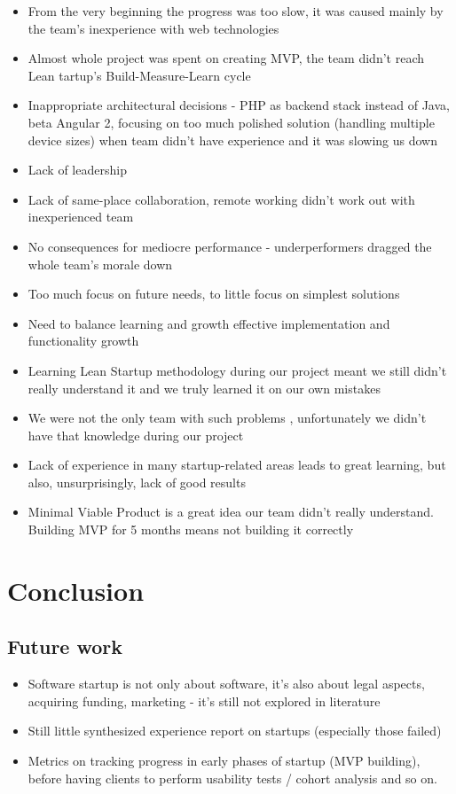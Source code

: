 \documentclass{article}
\begin{document}
\begin{itemize}
  \item From the very beginning the progress was too slow, it was caused mainly by the team's inexperience with web technologies 
  \item Almost whole project was spent on creating MVP, the team didn't reach Lean tartup's Build-Measure-Learn cycle
  \item Inappropriate architectural decisions - PHP as backend stack instead of Java, beta Angular 2, focusing on too much polished solution (handling multiple device sizes) when team didn't have experience and it was slowing us down
  \item Lack of leadership
  \item Lack of same-place collaboration, remote working didn't work out with inexperienced team
  \item No consequences for mediocre performance - underperformers dragged the whole team's morale down
  \item Too much focus on future needs, to little focus on simplest solutions
  \item Need to balance learning and growth effective implementation and functionality growth
  \item Learning Lean Startup methodology during our project meant we still didn't really understand it and we truly learned it on our own mistakes
  \item We were not the only team with such problems \cite{may2012applying}, unfortunately we didn't have that knowledge during our project
  \item Lack of experience in many startup-related areas leads to great learning, but also, unsurprisingly, lack of good results
  \item Minimal Viable Product is a great idea our team didn't really understand. Building MVP for 5 months means not building it correctly
\end{itemize}

\section{Conclusion}
\subsection{Future work}
\begin{itemize}
  \item Software startup is not only about software, it's also about legal aspects, acquiring funding, marketing - it's still not explored in literature
  \item Still little synthesized experience report on startups (especially those failed)
  \item Metrics on tracking progress in early phases of startup (MVP building), before having clients to perform usability tests / cohort analysis and so on.
  \end{itemize}
\newpage
\listoffigures

 
\end{document}
